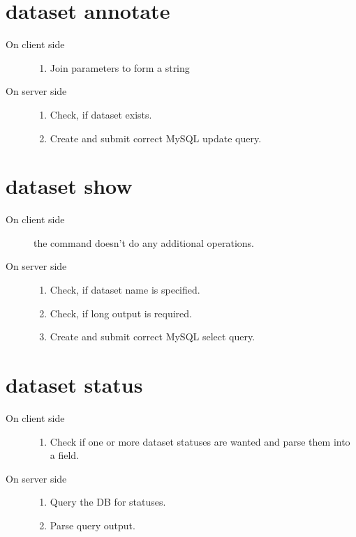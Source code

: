 \documentclass{scrreprt}
\begin{document}
\section{dataset annotate} 
\begin{description}
%
\item[On client side] \hfill
\begin{enumerate}
\item Join parameters to form a string
\end{enumerate}
%
\item[On server side] \hfill
\begin{enumerate}
\item Check, if dataset exists.
\item Create and submit correct MySQL update query.
\end{enumerate}
\end{description}


\section{dataset show}  
\begin{description}
%
\item[On client side] the command doesn't do any additional operations.
%
\item[On server side] \hfill
\begin{enumerate} 
\item Check, if dataset name is specified.
\item Check, if long output is required. 
\item Create and submit correct MySQL select query.

\end{enumerate}

\end{description}


\section{dataset status} 
\begin{description}
%
\item[On client side] \hfill
\begin{enumerate}
\item Check if one or more dataset statuses are wanted and parse them into a field.
\end{enumerate}

%
\item[On server side] \hfill
\begin{enumerate} 
\item Query the DB for statuses.
\item Parse query output.
\end{enumerate}

\end{description}
\end{document}
